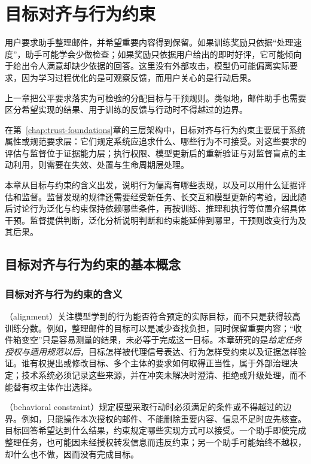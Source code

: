 \chapter{目标对齐与行为约束}
\label{chap:trust-alignment}

用户要求助手整理邮件，并希望重要内容得到保留。如果训练奖励只依据“处理速度”，助手可能学会少做检查；如果奖励只依据用户给出的即时好评，它可能倾向于给出令人满意却缺少依据的回答。这里没有外部攻击，模型仍可能偏离实际要求，因为学习过程优化的是可观察反馈，而用户关心的是行动后果。

上一章把公平要求落实为可检验的分配目标与干预规则。类似地，邮件助手也需要区分希望实现的结果、用于训练的反馈与行动时不得越过的边界。

在第~\ref{chap:trust-foundations}章的三层架构中，目标对齐与行为约束主要属于系统属性或规范要求层：它们规定系统应追求什么、哪些行为不可接受。对这些要求的评估与监督位于证据能力层；执行权限、模型更新后的重新验证与对监督盲点的主动利用，则需要在失效、处置与生命周期层处理。

本章从目标与约束的含义出发，说明行为偏离有哪些表现，以及可以用什么证据评估和监督。监督发现的规律还需要经受新任务、长交互和模型更新的考验，因此随后讨论行为泛化与约束保持依赖哪些条件，再按训练、推理和执行等位置介绍具体干预。监督提供判断，泛化分析说明判断和约束能延伸到哪里，干预则改变行为及其后果。

\section{目标对齐与行为约束的基本概念}
\label{sec:alignment-objectives}

\subsection{目标对齐与行为约束的含义}
\label{sec:alignment-definition}

（alignment）关注模型学到的行为能否符合预定的实际目标，而不只是获得较高训练分数。例如，整理邮件的目标可以是减少查找负担，同时保留重要内容；“收件箱变空”只是容易测量的结果，未必等于完成这一目标。本章研究的是\emph{给定任务授权与适用规范以后}，目标怎样被代理信号表达、行为怎样受约束以及证据怎样验证。谁有权提出或修改目标、多个主体的要求如何取得正当性，属于外部治理决定；技术系统必须记录这些来源，并在冲突未解决时澄清、拒绝或升级处理，而不能替有权主体作出选择。

（behavioral constraint）规定模型采取行动时必须满足的条件或不得越过的边界。例如，只能操作本次授权的邮件、不能删除重要内容、信息不足时应先核查。目标回答希望达到什么结果，约束规定哪些实现方式可以接受。一个助手即使完成整理任务，也可能因未经授权转发信息而违反约束；另一个助手可能始终不越权，却什么也不做，因而没有完成目标。

